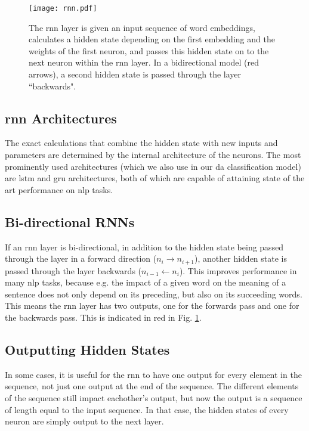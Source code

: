      \begin{figure}[ht]
        \centering
        \texttt{[image: rnn.pdf]}
        \caption{The \gls{rnn} layer is given an input sequence of word \glspl{embedding}, calculates a hidden state depending on the first \gls{embedding} and the weights of the first neuron, and passes this hidden state on to the next \gls{neuron} within the \gls{rnn} layer. 
        In a bidirectional \gls{model} (red arrows), a second hidden state is passed through the layer ``backwards".}
        \label{fig:rnn}
    \end{figure}


    \subsection{\gls{rnn} Architectures \label{ssec: rnn architectures}}
    The exact calculations that combine the hidden state with new inputs and parameters are determined by the internal architecture of the \glspl{neuron}. The most prominently used architectures (which we also use in our \gls{da} classification \gls{model}) are \gls{lstm}\cite{hochreiter1997long} and \gls{gru}\cite{chung2014empirical} architectures, both of which are capable of attaining state of the art performance on \gls{nlp} tasks\cite{huang2015bidirectional}.

    \subsection{Bi-directional RNNs \label{ssec: bidirectional RNN}}
    If an \gls{rnn} layer is bi-directional, in addition to the hidden state being passed through the layer in a forward direction ($n_i \rightarrow n_{i+1}$), another hidden state is passed through the layer backwards ($n_{i-1} \leftarrow n_i$). This improves performance in many \gls{nlp} tasks, because e.g.  the impact of a given word on the meaning of a sentence does not only depend on its preceding, but also on its succeeding words\cite{schuster1997bidirectional}. This means the \gls{rnn} layer has two outputs, one for the forwards pass and one for the backwards pass. This is indicated in red in Fig. \ref{fig:rnn}.

    \subsection{Outputting Hidden States \label{ssec: outputting hidden states}}
    In some cases, it is useful for the \gls{rnn} to have one output for every element in the sequence, not just one output at the end of the sequence. The different elements of the sequence still impact eachother's output, but now the output is a sequence of length equal to the input sequence. In that case, the hidden states of every \gls{neuron} are simply output to the next layer\cite{mlTextbook}.

